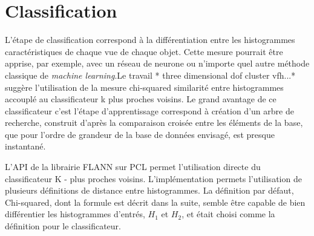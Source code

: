 \begin{figure}[H]
\end{figure}

\section {Classification} L'étape de classification correspond à la différentiation entre les
histogrammes caractéristiques de chaque vue de chaque objet. Cette
mesure pourrait être apprise, par exemple, avec un réseau de neurone
ou n'importe quel autre méthode classique de \textit{machine learning}.{\color{green}Le travail * three dimensional
dof cluster vfh...* suggère l'utilisation de la mesure chi-squared
similarité entre histogrammes accouplé au classificateur k plus
proches voisins. }  Le grand avantage de ce classificateur c'est l'étape
d’apprentissage correspond à création d’un arbre de recherche,
construit d'après la comparaison croisée entre les éléments de la base,
que pour l'ordre de grandeur de la base de données envisagé, est
presque instantané.

L'API de la librairie FLANN sur PCL permet l'utilisation directe du classificateur
K - plus proches voisins. L'implémentation permets l'utilisation de plusieurs
définitions de distance entre histogrammes. La définition par défaut, Chi-squared,
dont la formule est décrit dans la suite, semble être capable de bien différentier
les histogrammes d'entrés, $H_1$ et $H_2$, et était choisi comme la définition pour le classificateur.

